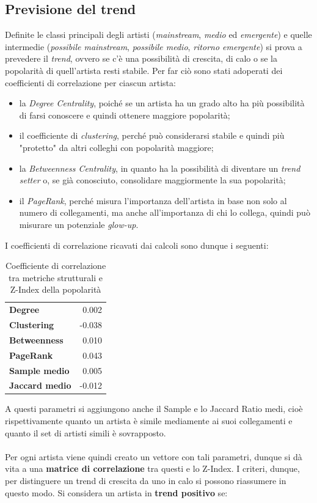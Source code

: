 \documentclass[sigchi]{acmart}
\begin{document}
\subsection{Previsione del trend}

Definite le classi principali degli artisti ({\itshape mainstream}, {\itshape medio} ed {\itshape emergente}) e quelle intermedie ({\itshape possibile mainstream}, {\itshape possibile medio}, {\itshape ritorno emergente}) si prova a prevedere il {\itshape trend}, ovvero se c'è una possibilità di crescita, di calo o se la popolarità di quell'artista resti stabile. Per far ciò sono stati adoperati dei coefficienti di correlazione per ciascun artista:

\begin{itemize}
\item la {\itshape Degree Centrality}, poiché se un artista ha un grado alto ha più possibilità di farsi conoscere e quindi ottenere maggiore popolarità;
\item il coefficiente di {\itshape clustering}, perché può considerarsi stabile e quindi più "protetto" da altri colleghi con popolarità maggiore;
\item la {\itshape Betweenness Centrality}, in quanto ha la possibilità di diventare un {\itshape trend setter} o, se già conosciuto, consolidare maggiormente la sua popolarità;
\item il {\itshape PageRank}, perché misura l'importanza dell'artista in base non solo al numero di collegamenti, ma anche all'importanza di chi lo collega, quindi può misurare un potenziale {\itshape glow-up}.
\end{itemize}

I coefficienti di correlazione ricavati dai calcoli sono dunque i seguenti:

\begin{table}[H]
\centering
\small
\begin{tabular}{l r}
\hline
\textbf{Degree} & 0.002 \\
\textbf{Clustering} & -0.038 \\
\textbf{Betweenness} & 0.010 \\
\textbf{PageRank} & 0.043 \\
\textbf{Sample medio} & 0.005 \\
\textbf{Jaccard medio} & -0.012 \\
\hline
\end{tabular}
\caption{Coefficiente di correlazione tra metriche strutturali e Z-Index della popolarità}
\label{tab:corrMetrics}
\end{table}
A questi parametri si aggiungono anche il Sample e lo Jaccard Ratio medi, cioè rispettivamente quanto un artista è simile mediamente ai suoi collegamenti e quanto il set di artisti simili è sovrapposto. \\ \\ Per ogni artista viene quindi creato un vettore con tali parametri, dunque si dà vita a una {\bfseries matrice di correlazione} tra questi e lo Z-Index. I criteri, dunque, per distinguere un trend di crescita da uno in calo si possono riassumere in questo modo.
Si considera un artista in {\bfseries trend positivo} se:
\end{document}

